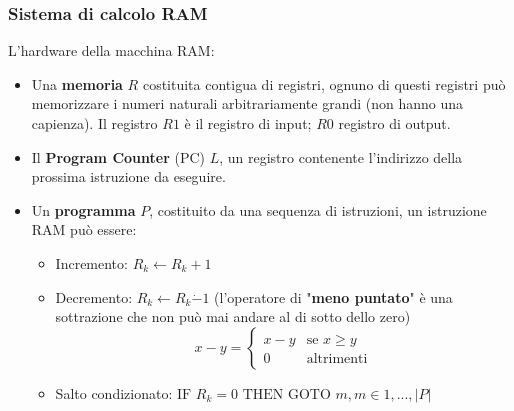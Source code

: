\documentclass{article}
\begin{document}
\subsubsection{Sistema di calcolo RAM}
L'hardware della macchina RAM:
\begin{itemize}
    \item Una \textbf{memoria} $R$ costituita contigua di registri, ognuno di questi registri può memorizzare
          i numeri naturali arbitrariamente grandi (non hanno una capienza).
          Il registro $R1$ è il registro di input; $R0$ registro di output.

    \item Il \textbf{Program Counter} (PC) $L$, un registro contenente l'indirizzo della prossima
          istruzione da eseguire.

    \item Un \textbf{programma} $P$, costituito da una  sequenza di istruzioni, un istruzione RAM può essere:
          \begin{itemize}
              \item Incremento: $R_k \leftarrow R_k +1$
              \item Decremento: $R_k \leftarrow R_k \dot{-}1$ (l'operatore di "\textbf{meno puntato}" è una sottrazione che non può mai andare al di sotto dello zero)
                    \[
                        x-y=
                        \begin{cases}
                            x-y & \text{se } x\geq y \\
                            0   & \text{altrimenti}
                        \end{cases}
                    \]
              \item Salto condizionato: $\text{IF } R_k=0\text{ THEN GOTO } m, m\in{1,...,|P|}$
          \end{itemize}
\end{itemize}
\end{document}
